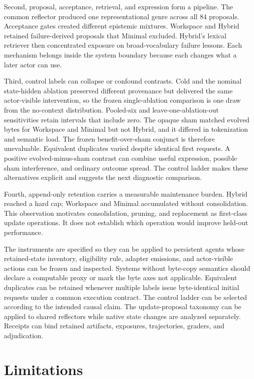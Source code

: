 \documentclass[10pt,twocolumn]{article}
\begin{document}
Second, proposal, acceptance, retrieval, and expression form a pipeline.
The common reflector produced one representational genre across all 84
proposals. Acceptance gates created different epistemic mixtures.
Workspace and Hybrid retained failure-derived proposals that Minimal
excluded. Hybrid's lexical retriever then concentrated exposure on
broad-vocabulary failure lessons. Each mechanism belongs inside the
system boundary because each changes what a later actor can use.

Third, control labels can collapse or confound contrasts. Cold and the
nominal state-hidden ablation preserved different provenance but
delivered the same actor-visible intervention, so the frozen
single-ablation comparison is one draw from the no-context distribution.
Pooled-six and leave-one-ablation-out sensitivities retain intervals
that include zero. The opaque sham matched evolved bytes for Workspace
and Minimal but not Hybrid, and it differed in tokenization and semantic
load. The frozen benefit-over-sham conjunct is therefore unevaluable.
Equivalent duplicates varied despite identical first requests. A
positive evolved-minus-sham contrast can combine useful expression,
possible sham interference, and ordinary outcome spread. The control
ladder makes these alternatives explicit and suggests the next
diagnostic comparison.

Fourth, append-only retention carries a measurable maintenance burden.
Hybrid reached a hard cap; Workspace and Minimal accumulated without
consolidation. This observation motivates consolidation, pruning, and
replacement as first-class update operations. It does not establish
which operation would improve held-out performance.

The instruments are specified so they can be applied to persistent
agents whose retained-state inventory, eligibility rule, adapter
emissions, and actor-visible actions can be frozen and inspected.
Systems without byte-copy semantics should declare a computable proxy or
mark the byte axes not applicable. Equivalent duplicates can be retained
whenever multiple labels issue byte-identical initial requests under a
common execution contract. The control ladder can be selected according
to the intended causal claim. The update-proposal taxonomy can be
applied to shared reflectors while native state changes are analyzed
separately. Receipts can bind retained artifacts, exposures,
trajectories, graders, and adjudication.

\section{Limitations}\label{limitations}
\end{document}
